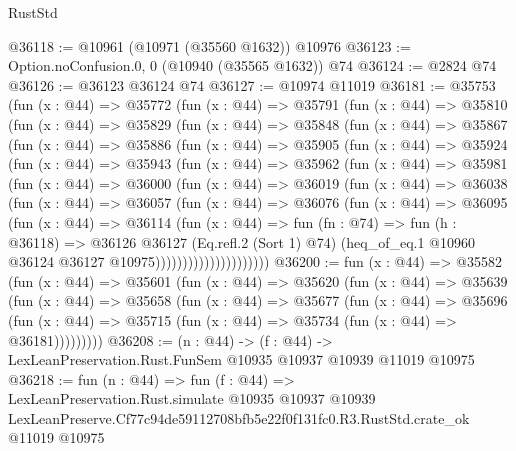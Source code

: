 \begin{lexlean}{RustStd}
\begin{coremodule}
@36118 := @10961 (@10971 (@35560 @1632)) @10976
@36123 := Option.noConfusion.{0, 0} (@10940 (@35565 @1632)) @74
@36124 := @2824 @74
@36126 := @36123 @36124 @74
@36127 := @10974 @11019
@36181 := @35753
    (fun (x : @44) =>
    @35772
      (fun (x : @44) =>
      @35791
        (fun (x : @44) =>
        @35810
          (fun (x : @44) =>
          @35829
            (fun (x : @44) =>
            @35848
              (fun (x : @44) =>
              @35867
                (fun (x : @44) =>
                @35886
                  (fun (x : @44) =>
                  @35905
                    (fun (x : @44) =>
                    @35924
                      (fun (x : @44) =>
                      @35943
                        (fun (x : @44) =>
                        @35962
                          (fun (x : @44) =>
                          @35981
                            (fun (x : @44) =>
                            @36000
                              (fun (x : @44) =>
                              @36019
                                (fun (x : @44) =>
                                @36038
                                  (fun (x : @44) =>
                                  @36057
                                    (fun (x : @44) =>
                                    @36076
                                      (fun (x : @44) =>
                                      @36095
                                        (fun (x : @44) =>
                                        @36114
                                          (fun (x : @44) =>
                                          fun (fn : @74) =>
                                          fun (h : @36118) =>
                                          @36126
                                            @36127
                                            (Eq.refl.{2} (Sort 1) @74)
                                            (heq_of_eq.{1}
                                              @10960
                                              @36124
                                              @36127
                                              @10975)))))))))))))))))))))
@36200 := fun (x : @44) =>
  @35582
    (fun (x : @44) =>
    @35601
      (fun (x : @44) =>
      @35620
        (fun (x : @44) =>
        @35639
          (fun (x : @44) =>
          @35658
            (fun (x : @44) =>
            @35677
              (fun (x : @44) =>
              @35696
                (fun (x : @44) => @35715 (fun (x : @44) => @35734 (fun (x : @44) => @36181)))))))))
@36208 := (n : @44) ->
  (f : @44) -> LexLeanPreservation.Rust.FunSem @10935 @10937 @10939 @11019 @10975
@36218 := fun (n : @44) =>
  fun (f : @44) =>
  LexLeanPreservation.Rust.simulate
    @10935
    @10937
    @10939
    LexLeanPreserve.Cf77c94de59112708bfb5e22f0f131fc0.R3.RustStd.crate_ok
    @11019
    @10975
\end{coremodule}
\end{lexlean}
